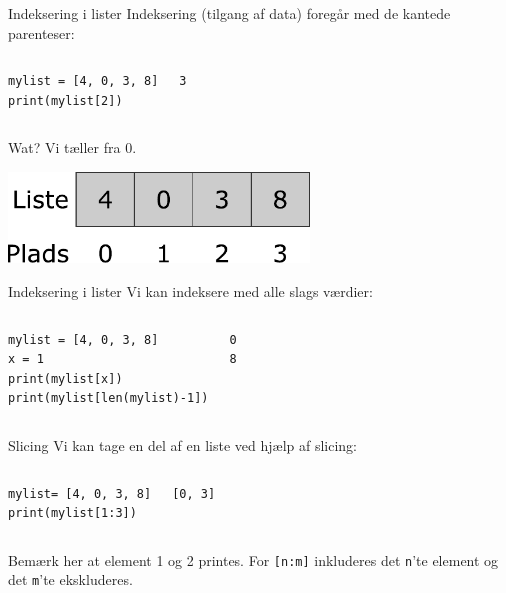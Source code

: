 \begin{frame}[fragile]{Indeksering i lister}
	Indeksering (tilgang af data) foregår med de kantede parenteser:
	\begin{columns}
		\begin{lstlisting}[style=python]
mylist = [4, 0, 3, 8]
print(mylist[2])
		\end{lstlisting}
		\pause
		\begin{lstlisting}[style=python]
3
		\end{lstlisting}
	\end{columns}
	Wat? \pause Vi tæller fra 0.
	\begin{center}
		\includegraphics[width=0.6\textwidth]{figs/list.pdf}
	\end{center}

\end{frame}


\begin{frame}[fragile]{Indeksering i lister}
Vi kan indeksere med alle slags værdier:
\begin{columns}
	\column{0.5\textwidth}
	\begin{lstlisting}[style=python]
mylist = [4, 0, 3, 8]
x = 1
print(mylist[x])
print(mylist[len(mylist)-1])
	\end{lstlisting}
	\pause
	\column{0.3\textwidth}
	\begin{lstlisting}[style=python]
0
8
	\end{lstlisting}
\end{columns}

\end{frame}

\begin{frame}[fragile]{Slicing}
	Vi kan tage en del af en liste ved hjælp af slicing:
	\begin{columns}
		\column{0.4\textwidth}
		\begin{lstlisting}[style=python]
mylist= [4, 0, 3, 8]
print(mylist[1:3])
		\end{lstlisting}
		\pause
		\begin{lstlisting}[style=python]
[0, 3]
		\end{lstlisting}
	\end{columns}
	Bemærk her at element 1 og 2 printes. For \texttt{[n:m]} inkluderes det \texttt{n}'te element og det \texttt{m}'te ekskluderes.
\end{frame}


